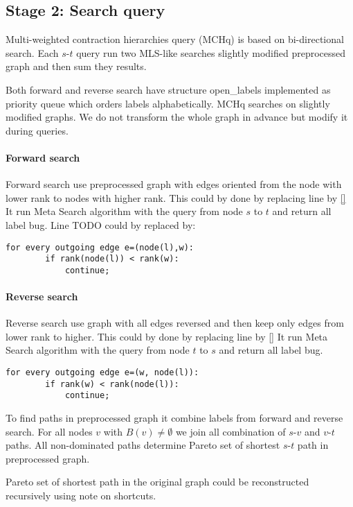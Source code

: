 
\subsection{Stage 2: Search query}
\label{subsecStage2}

Multi-weighted contraction hierarchies query (MCHq) 
is based on bi-directional search.
Each $s$-$t$ query run two MLS-like searches slightly modified preprocessed graph
and then sum they results.

Both forward and reverse search have
structure open\_labels implemented as priority queue which orders labels
alphabetically.
MCHq searches on slightly modified graphs. 
We do not transform the whole graph in advance but modify it during queries.

\paragraph*{Forward search}
Forward search use preprocessed graph with edges oriented from the node with lower rank to nodes with higher rank.
This could by done by replacing line  by \ref{}
It run Meta Search algorithm with the query from node $s$ to $t$ and return all label bug.
Line TODO could by replaced by:

\begin{lstlisting}[caption={MCHp},label=list:8-6,captionpos=t,float,abovecaptionskip=-\medskipamount]
    for every outgoing edge e=(node(l),w):
    	if rank(node(l)) < rank(w):
        	continue;
\end{lstlisting}

\paragraph*{Reverse search}
Reverse search use graph with all edges reversed and then keep only edges
from lower rank to higher. 
This could by done by replacing line  by \ref{}
It run Meta Search algorithm with the query from node $t$ to $s$ and return all label bug.

\begin{lstlisting}[caption={MCHp},label=list:8-6,captionpos=t,float,abovecaptionskip=-\medskipamount]
    for every outgoing edge e=(w, node(l)):
    	if rank(w) < rank(node(l)):
        	continue;
\end{lstlisting}

To find paths in preprocessed graph it combine labels from forward and reverse search. 
For all nodes $v$ with $B(v) \ne \emptyset$ we join all combination of $s$-$v$ and $v$-$t$ paths. 
All non-dominated paths determine Pareto set of shortest $s$-$t$ path in preprocessed graph.

Pareto set of shortest path in the original graph could be reconstructed recursively
using note on shortcuts.

